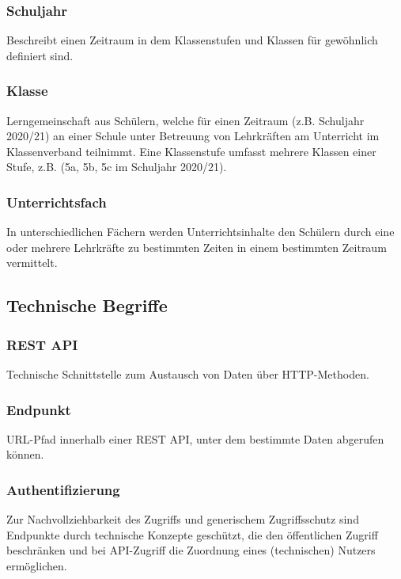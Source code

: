 \subsubsection*{Schuljahr}
Beschreibt einen Zeitraum in dem Klassenstufen und Klassen für gewöhnlich definiert sind.

\subsubsection*{Klasse}
Lerngemeinschaft aus Schülern, welche für einen Zeitraum (z.B. Schuljahr 2020/21) an einer Schule unter Betreuung von Lehrkräften am Unterricht im Klassenverband teilnimmt. Eine Klassenstufe umfasst mehrere Klassen einer Stufe, z.B. (5a, 5b, 5c im Schuljahr 2020/21).

\subsubsection*{Unterrichtsfach}
In unterschiedlichen Fächern werden Unterrichtsinhalte den Schülern durch eine oder mehrere Lehrkräfte zu bestimmten Zeiten in einem bestimmten Zeitraum vermittelt.  

\subsection{Technische Begriffe}

\subsubsection*{REST API}

Technische Schnittstelle zum Austausch von Daten über HTTP-Methoden.

\subsubsection*{Endpunkt}

URL-Pfad innerhalb einer REST API, unter dem bestimmte Daten abgerufen können.

\subsubsection*{Authentifizierung}

Zur Nachvollziehbarkeit des Zugriffs und generischem Zugriffsschutz sind Endpunkte durch technische Konzepte geschützt, die den öffentlichen Zugriff beschränken und bei API-Zugriff die Zuordnung eines (technischen) Nutzers ermöglichen.
 
